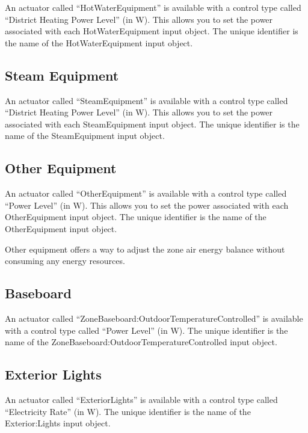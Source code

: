 An actuator called ``HotWaterEquipment'' is available with a control type called ``District Heating Power Level'' (in W). This allows you to set the power associated with each HotWaterEquipment input object. The unique identifier is the name of the HotWaterEquipment input object.

\subsection{Steam Equipment}\label{steam-equipment}

An actuator called ``SteamEquipment'' is available with a control type called ``District Heating Power Level'' (in W). This allows you to set the power associated with each SteamEquipment input object. The unique identifier is the name of the SteamEquipment input object.

\subsection{Other Equipment}\label{other-equipment}

An actuator called ``OtherEquipment'' is available with a control type called ``Power Level'' (in W). This allows you to set the power associated with each OtherEquipment input object. The unique identifier is the name of the OtherEquipment input object.

Other equipment offers a way to adjust the zone air energy balance without consuming any energy resources.

\subsection{Baseboard}\label{baseboard}

An actuator called ``ZoneBaseboard:OutdoorTemperatureControlled'' is available with a control type called ``Power Level'' (in W). The unique identifier is the name of the ZoneBaseboard:OutdoorTemperatureControlled input object.

\subsection{Exterior Lights}\label{exterior-lights}

An actuator called ``ExteriorLights'' is available with a control type called ``Electricity Rate'' (in W). The unique identifier is the name of the Exterior:Lights input object.
